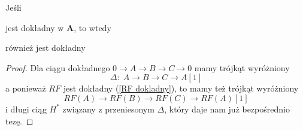\begin{fact}
  Jeśli
  \begin{center}\end{center}
  jest dokładny w $\mathbf{A}$, to wtedy
  \begin{center}\end{center}
  również jest dokładny
\end{fact}

\begin{proof}
  Dla ciągu dokładnego $0\to A\to B\to C\to 0$ mamy trójkąt wyróżniony
  $$\Delta:\;A\to B\to C\to A[1]$$
  a ponieważ $RF$ jest dokładny (\ref{RF dokladny}), to mamy też trójkąt wyróżniony
  $$RF(A)\to RF(B)\to RF(C)\to RF(A)[1]$$
  i długi ciąg $H^*$ związany z przeniesonym $\Delta$, który daje nam już bezpośrednio tezę.
\end{proof}
